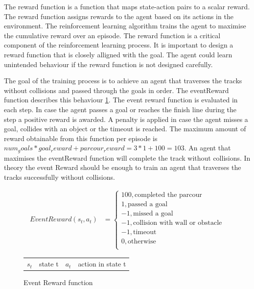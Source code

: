 The reward function is a function that maps state-action pairs to a scalar reward. The reward function assigns rewards to the agent based on its actions in the environment. The reinforcement learning algorithm trains the agent to maximise the cumulative reward over an episode. The reward function is a critical component of the reinforcement learning process. It is important to design a reward function that is closely alligned with the goal. The agent could learn unintended behaviour if the reward function is not designed carefully.

The goal of the training process is to achieve an agent that traverses the tracks without collisions and passed through the goals in order. The eventReward function describes this behaviour \ref{fig:eventReward_function}. The event reward function is evaluated in each step. In case the agent passes a goal or reaches the finish line during the step a positive reward is awarded. A penalty is applied in case the agent misses a goal, collides with an object or the timeout is reached. The maximum amount of reward obtainable from this function per episode is $num_goals * goal_reward + parcour_reward = 3 * 1 + 100 = 103$. An agent that maximises the eventReward function will complete the track without collisions. In theory the event Reward should be enough to train an agent that traverses the tracks successfully without collisions.


\begin{figure}
    \centering
    \begin{align}
         EventReward(s_t, a_t) &= \begin{cases}
              100,           \text{completed the parcour}           \\
              1,             \text{passed a goal}                   \\
              -1,            \text{missed a goal}                   \\
              -1,            \text{collision with wall or obstacle} \\
              -1,            \text{timeout}                         \\
              0,             \text{otherwise}                       \\
         \end{cases} \nonumber
    \end{align}
    \caption{Event Reward function}
    \begin{tabular}{r@{: }l r@{: }l}
    $s_t$& state t & $a_t$& action in state t 
    \end{tabular}
    \label{fig:eventReward_function}
\end{figure}


